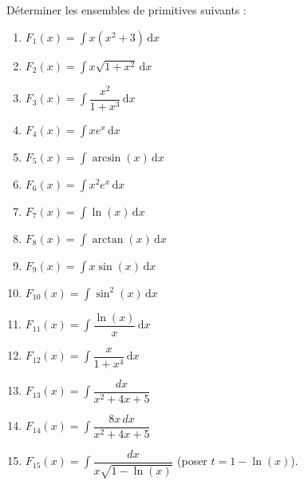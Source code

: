 
\begin{exercice}\label{exostarterST-0018}

 
Déterminer les ensembles de  primitives suivants :
\begin{multicols}{3}
  \begin{enumerate}
  \item $F_{1}(x)=\displaystyle\int x(x^2+3) \,\mathrm dx$ 
  \item $F_{2}(x)=\displaystyle\int x\sqrt{1+x^2} \,\mathrm dx$ 
  \item $F_{3}(x)=\displaystyle\int \dfrac{x^2}{1+x^3} \,\mathrm dx$ 
  \item $F_{4}(x)=\displaystyle\int x e^x  \,\mathrm dx$ 
  \item $F_{5}(x)=\displaystyle\int\arcsin (x) \,\mathrm dx$ 
  \item $F_{6}(x)=\displaystyle\int x^2 e^x  \,\mathrm dx$ 
  \item $F_{7}(x)=\displaystyle\int\ln (x) \,\mathrm dx$ 
  \item $F_{8}(x)=\displaystyle\int\arctan (x) \,\mathrm dx$ 
  \item $F_{9}(x)=\displaystyle\int x\sin (x) \,\mathrm dx$  
  \item $F_{10}(x)=\displaystyle\int\sin^2 (x)\,\mathrm dx$  
  \item $F_{11}(x)=\displaystyle\int\dfrac{\ln(x)}{x}\,\mathrm dx$
  \item $F_{12}(x)=\displaystyle\int\dfrac{x}{1+x^4}\,\mathrm dx$ 
  \item $F_{13}(x)=\displaystyle\int\dfrac{dx}{x^2+4x+5}$
  \item $F_{14}(x)=\displaystyle\int\dfrac{8x\, dx}{x^2+4x+5}$
  \item $F_{15}(x)=\displaystyle\int \dfrac{dx}{x\sqrt{1-\ln (x)}}$  (poser $t=1-\ln(x)$).



  \end{enumerate}
\end{multicols}


\end{exercice}
